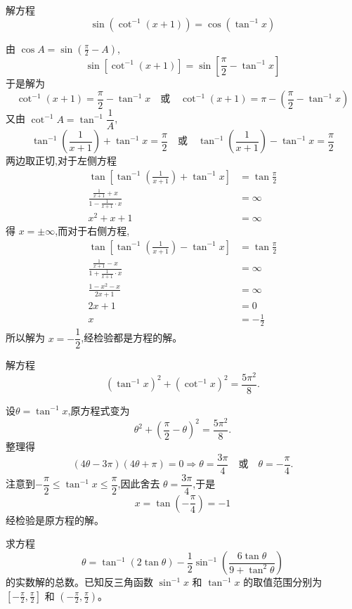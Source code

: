 \begin{questions}
    \question 解方程
    \[
    \sin(\cot^{-1}(x+1)) = \cos(\tan^{-1} x)
    \]
    \begin{solution}
        由 $\cos A = \sin\left(\frac{\pi}{2} - A\right)$,
        \[ 
        \sin[\cot^{-1}(x+1)] = \sin\left[\frac{\pi}{2} - \tan^{-1} x\right] 
        \]
        于是解为
        \[
        \cot^{-1}(x+1) = \frac{\pi}{2} - \tan^{-1} x \quad \text{或} \quad \cot^{-1}(x+1) = \pi - \left(\frac{\pi}{2} - \tan^{-1} x\right) 
        \]
        又由 $\cot^{-1} A = \tan^{-1}\dfrac{1}{A}$,
        \[ 
        \tan^{-1}\left(\frac{1}{x+1}\right) + \tan^{-1} x = \frac{\pi}{2} \quad \text{或} \quad \tan^{-1}\left(\frac{1}{x+1}\right) - \tan^{-1} x = \frac{\pi}{2} 
        \]
        两边取正切,对于左侧方程
        \begin{align*}
        \tan\left[\tan^{-1}\left(\frac{1}{x+1}\right) + \tan^{-1} x\right] &= \tan \frac{\pi}{2} \\
        \frac{\frac{1}{x+1} + x}{1 - \frac{1}{x+1} \cdot x} &= \infty \\
        x^2 + x + 1 &= \infty
        \end{align*}
        得 $x = \pm \infty$,而对于右侧方程,
        \begin{align*}
        \tan\left[\tan^{-1}\left(\frac{1}{x+1}\right) - \tan^{-1} x\right] &= \tan \frac{\pi}{2} \\
        \frac{\frac{1}{x+1} - x}{1 + \frac{1}{x+1} \cdot x} &= \infty \\
        \frac{1 - x^2 - x}{2x + 1} &= \infty \\
        2x + 1 &= 0 \\
        x &= -\frac{1}{2}
        \end{align*}
        所以解为 $x = -\dfrac{1}{2}$,经检验都是方程的解。
    \end{solution}

    \question 解方程
    \[
    (\tan^{-1} x)^2+(\cot^{-1} x)^2=\frac{5\pi^2}{8}.
    \]
    \begin{solution}
        设$\theta=\tan^{-1}x$,原方程式变为
        \[
        \theta^2+\left(\frac{\pi}{2}-\theta\right)^2=\frac{5\pi^2}{8}.
        \]
        整理得
        \[
        (4\theta-3\pi)(4\theta+\pi)=0 \Rightarrow \theta=\frac{3\pi}{4}\quad \text{或}\quad \theta=-\frac{\pi}{4}.
        \]
        注意到$-\dfrac{\pi}{2}\le \tan^{-1}x\le \dfrac{\pi}{2}$,因此舍去 $\theta=\dfrac{3\pi}{4}$,于是
        \[
        x=\tan\left(-\frac{\pi}{4}\right)=-1
        \]
        经检验是原方程的解。
    \end{solution}
\question 求方程
\[
\theta = \tan^{-1}(2\tan\theta) - \frac{1}{2}\sin^{-1}\left( \frac{6\tan\theta}{9 + \tan^2\theta} \right)
\]
的实数解的总数。已知反三角函数 $\sin^{-1}x$ 和 $\tan^{-1}x$ 的取值范围分别为 $[-\frac{\pi}{2}, \frac{\pi}{2}]$ 和 $(-\frac{\pi}{2}, \frac{\pi}{2})$。


\end{questions}
